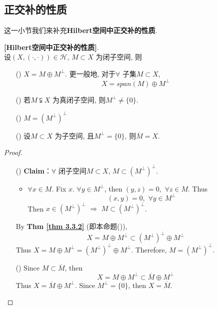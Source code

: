 \newpage

\subsection{正交补的性质}
	这一小节我们来补充\textbf{Hilbert空间中正交补的性质}. 
	
	\vspace{1em}
	
	\begin{proposition}\label{prop 3.3.2}
		\textbf{[Hilbert空间中正交补的性质]}. \\
		设$(X , (\cdot , \cdot)) \in \mathcal{H}$, $M \subset X$ 为闭子空间, 则
		
		\vspace{1em}
		
		\begin{enumerate}
			\item[(\rmnum{1})] $X = M \oplus M^{\perp}$. 更一般地, 对于$\forall$ 子集$M \subset X$, 
			\[ X = \overline{span(M)} \oplus M^{\perp} \]
			
			\item[(\rmnum{2})] 若$M \subsetneqq X$ 为真闭子空间, 则$M^{\perp} \neq \{ 0 \}$. 
			
			\item[(\rmnum{3})] $M = \left( M^{\perp} \right)^{\perp}$ 
			
			\item[(\rmnum{4})] 设$M \subset X$ 为子空间, 且$M^{\perp} = \{ 0 \}$, 则$\overline{M} = X$. 
		\end{enumerate}
		
		\vspace{6em}
		
		\begin{proof}
			\begin{enumerate}
				\item[(\rmnum{3})] \textbf{Claim}：$\forall$ 闭子空间$M \subset X$, $M \subset \left( M^{\perp} \right)^{\perp}$. 
				\begin{itemize}
					\item $\forall x \in M$. Fix $x$. $\forall y \in M^{\perp}$, then $(y , z) = 0 , \,\, \forall z \in M$. Thus
					\[ (x , y) = 0 , \,\, \forall y \in M^{\perp} \]
					Then $x \in \left( M^{\perp} \right)^{\perp} \,\, \Rightarrow \,\, M \subset \left( M^{\perp} \right)^{\perp}$. 
				\end{itemize}
				By \textbf{Thm \ref{thm 3.3.2}} (即本命题()), 
				\[ X = M \oplus M^{\perp} \subset \left( M^{\perp} \right)^{\perp} \oplus M^{\perp} \]
				Thus $X = M \oplus M^{\perp} = \left( M^{\perp} \right)^{\perp} \oplus M^{\perp}$. Therefore, $M = \left( M^{\perp} \right)^{\perp}$. 
				
				\vspace{5em}
				
				\item[(\rmnum{4})] Since $M \subset \overline{M}$, then 
				\[ X = M \oplus M^{\perp} \subset \overline{M} \oplus M^{\perp} \]
				Thus $X = \overline{M} \oplus M^{\perp}$. Since $M^{\perp} = \{ 0 \}$, then $X = \overline{M}$.
			\end{enumerate}
		\end{proof}
	\end{proposition}

